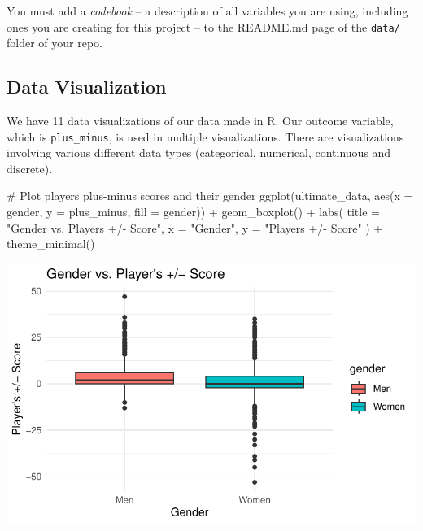 \documentclass[
  letterpaper,
  DIV=11,
  numbers=noendperiod]{scrartcl}
\newenvironment{Shaded}{\begin{snugshade}}{\end{snugshade}}
\newcommand{\AttributeTok}[1]{\textcolor[rgb]{0.40,0.45,0.13}{#1}}
\newcommand{\CommentTok}[1]{\textcolor[rgb]{0.37,0.37,0.37}{#1}}
\newcommand{\FunctionTok}[1]{\textcolor[rgb]{0.28,0.35,0.67}{#1}}
\newcommand{\NormalTok}[1]{\textcolor[rgb]{0.00,0.23,0.31}{#1}}
\newcommand{\SpecialCharTok}[1]{\textcolor[rgb]{0.37,0.37,0.37}{#1}}
\newcommand{\StringTok}[1]{\textcolor[rgb]{0.13,0.47,0.30}{#1}}
\begin{document}
You must add a \emph{codebook} -- a description of all variables you are
using, including ones you are creating for this project -- to the
README.md page of the \texttt{data/} folder of your repo.

\subsection{Data Visualization}\label{data-visualization}

We have 11 data visualizations of our data made in R. Our outcome
variable, which is \texttt{plus\_minus}, is used in multiple
visualizations. There are visualizations involving various different
data types (categorical, numerical, continuous and discrete).

\begin{Shaded}
\begin{Highlighting}[]
\CommentTok{\# Plot player\textquotesingle{}s plus{-}minus scores and their gender}
\FunctionTok{ggplot}\NormalTok{(ultimate\_data, }\FunctionTok{aes}\NormalTok{(}\AttributeTok{x =}\NormalTok{ gender, }\AttributeTok{y =}\NormalTok{ plus\_minus, }\AttributeTok{fill =}\NormalTok{ gender)) }\SpecialCharTok{+}
  \FunctionTok{geom\_boxplot}\NormalTok{() }\SpecialCharTok{+}
  \FunctionTok{labs}\NormalTok{(}
    \AttributeTok{title =} \StringTok{"Gender vs. Player\textquotesingle{}s +/{-} Score"}\NormalTok{,}
    \AttributeTok{x =} \StringTok{"Gender"}\NormalTok{,}
    \AttributeTok{y =} \StringTok{"Player\textquotesingle{}s +/{-} Score"}
\NormalTok{  ) }\SpecialCharTok{+}
  \FunctionTok{theme\_minimal}\NormalTok{()}
\end{Highlighting}
\end{Shaded}

\includegraphics{final_eda_files/figure-pdf/gender-&-plus-minus-1.pdf}
\end{document}
